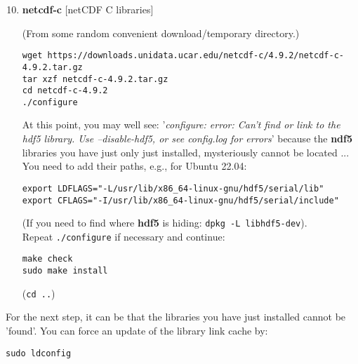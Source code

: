 \documentclass[10pt,twoside]{article}
\begin{document}
\vspace{2pt}

\begin{enumerate}[noitemsep]
\setcounter{enumi}{9}

\vspace{4pt}
\item \textbf{netcdf-c} [netCDF C libraries]

\vspace{-2pt}
(From some random convenient download/temporary directory.)
\begin{verbatim}
wget https://downloads.unidata.ucar.edu/netcdf-c/4.9.2/netcdf-c-4.9.2.tar.gz
tar xzf netcdf-c-4.9.2.tar.gz
cd netcdf-c-4.9.2
./configure
\end{verbatim}
At this point, you may well see: '\textit{configure: error: Can't find or link to the hdf5 library. Use --disable-hdf5, or see config.log for errors}' because the \textbf{ndf5} libraries you have just only just installed, mysteriously cannot be located ... You need to add their paths, e.g., for Ubuntu 22.04:
\vspace{-2pt}
\begin{verbatim}
export LDFLAGS="-L/usr/lib/x86_64-linux-gnu/hdf5/serial/lib"
export CFLAGS="-I/usr/lib/x86_64-linux-gnu/hdf5/serial/include"
\end{verbatim}
(If you need to find where \textbf{hdf5} is hiding: \texttt{dpkg -L libhdf5-dev}).
\vspace{2pt}
\\Repeat \texttt{./configure} if necessary and continue:
\vspace{-2pt}
\begin{verbatim}
make check
sudo make install
\end{verbatim}
\vspace{-2pt}
(\texttt{cd ..})

\end{enumerate}

\noindent For the next step, it can be that the libraries you have just installed cannot be 'found'. You can force an update of the library link cache by:
\vspace{-2pt}
\begin{verbatim}
sudo ldconfig
\end{verbatim}

\newpage
\end{document}
